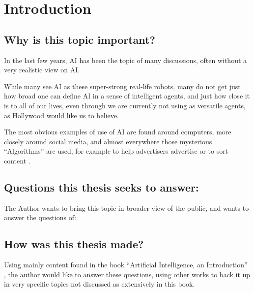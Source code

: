 \chapter{Introduction}
\section{Why is this topic important?}
In the last few years, AI has been the topic of many discussions, often without a very realistic view on AI.

While many see AI as these super-strong real-life robots, many do not get just how broad one can define AI in a sense of intelligent agents, and just how close it is to all of our lives, even through we are currently not using as versatile agents, as Hollywood would like us to believe.

The most obvious examples of use of AI are found around computers, more closely around social media, and almost everywhere those mysterious “Algorithms” are used, for example to help advertisers advertise \cite{facebookWerbungAufInstagram} or to sort content \cite{googleFunktioniertGoogleSucheSuchalgorithmen}.
\section{Questions this thesis seeks to answer:}
The Author wants to bring this topic in broader view of the public, and wants to answer the questions of: 
\section{How was this thesis made?}
Using mainly content found in the book “Artificial Intelligence, an Introduction” \cite{russellArtificialIntelligenceModern2010}, the author would like to answer these questions, using other works to back it up in very specific topics not discussed as extensively in this book.